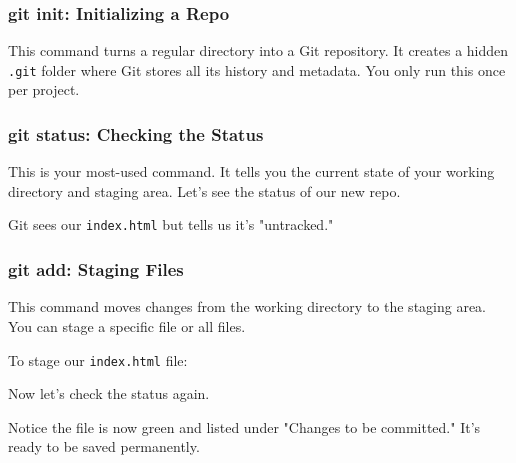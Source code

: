 \documentclass[11pt, a4paper]{article}
\newcommand{\cmd}[1]{\texttt{\textcolor{commandColor}{#1}}}
\begin{document}
\subsubsection{git init: Initializing a Repo}
This command turns a regular directory into a Git repository. It creates a hidden \cmd{.git} folder where Git stores all its history and metadata. You only run this once per project.


\subsubsection{git status: Checking the Status}
This is your most-used command. It tells you the current state of your working directory and staging area. Let's see the status of our new repo.

Git sees our \cmd{index.html} but tells us it's "untracked."

\subsubsection{git add: Staging Files}
This command moves changes from the working directory to the staging area. You can stage a specific file or all files.

To stage our \cmd{index.html} file:

Now let's check the status again.
Notice the file is now green and listed under "Changes to be committed." It's ready to be saved permanently.
\end{document}
